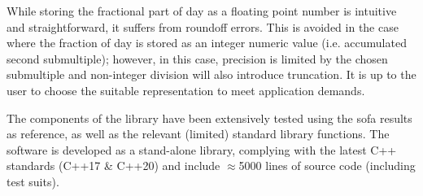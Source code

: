 While storing the fractional part of day as a floating point number is intuitive and 
straightforward, it suffers from roundoff errors. This is avoided in the case where 
the fraction of day is stored as an integer numeric value (i.e. accumulated second 
submultiple); however, in this case, precision is limited by the chosen submultiple 
and non-integer division will also introduce truncation. It is up to the user to 
choose the suitable representation to meet application demands.

The components of the library have been extensively tested using the \gls{sofa} results 
as reference, as well as the relevant (limited) standard library functions. The 
software is developed as a stand-alone library, complying with the latest C++ standards 
(C++17 \& C++20) and include $\approx$5000 lines of source code (including test suits).
